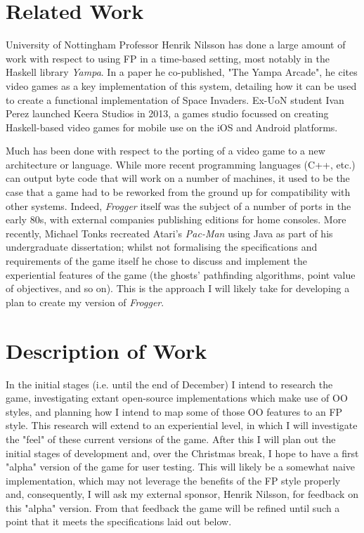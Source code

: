 \documentclass[12pt, a4paper]{report}
\begin{document}
\section{Related Work}
University of Nottingham Professor Henrik Nilsson has done a large amount of work with respect to using FP in a time-based setting, most notably in the Haskell library \textit{Yampa}.
In a paper he co-published, "The Yampa Arcade"\cite{yampaarcade}, he cites video games as a key implementation of this system, detailing how it can be used to create a functional implementation of Space Invaders.
Ex-UoN student Ivan Perez launched Keera Studios in 2013, a games studio focussed on creating Haskell-based video games for mobile use on the iOS and Android platforms.

\par

Much has been done with respect to the porting of a video game to a new architecture or language.
While more recent programming languages (C++, etc.) can output byte code that will work on a number of machines, it used to be the case that a game had to be reworked from the ground up for compatibility with other systems.
Indeed, \textit{Frogger} itself was the subject of a number of ports in the early 80s, with external companies publishing editions for home consoles.
More recently, Michael Tonks recreated Atari's \textit{Pac-Man} using Java as part of his undergraduate dissertation; whilst not formalising the specifications and requirements of the game itself he chose to discuss and implement the experiential features of the game (the ghosts' pathfinding algorithms, point value of objectives, and so on)\cite{michaeltonks}.
This is the approach I will likely take for developing a plan to create my version of \textit{Frogger}.


\section{Description of Work}
In the initial stages (i.e. until the end of December) I intend to research the game, investigating extant open-source implementations which make use of OO styles, and planning how I intend to map some of those OO features to an FP style.
This research will extend to an experiential level, in which I will investigate the "feel" of these current versions of the game.
After this I will plan out the initial stages of development and, over the Christmas break, I hope to have a first "alpha" version of the game for user testing.
This will likely be a somewhat naive implementation, which may not leverage the benefits of the FP style properly and, consequently, I will ask my external sponsor, Henrik Nilsson, for feedback on this "alpha" version.
From that feedback the game will be refined until such a point that it meets the specifications laid out below.
\end{document}
